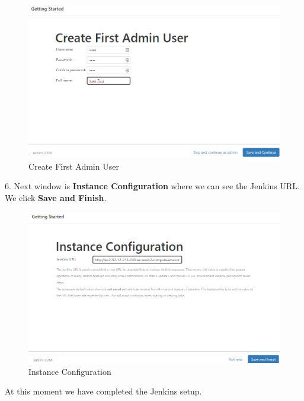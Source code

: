 \documentclass[12pt,a4paper,twoside]{article}
\begin{document}
\begin{figure}[h!]
    \centering
        \includegraphics[width=15cm]{images-aws/26-jenkins-admin-user.png}
        \caption{Create First Admin User}
\end{figure}





6. Next window is \textbf{Instance Configuration} where we can see the Jenkins URL. We click \textbf{Save and Finish}.

\begin{figure}[h!]
    \centering
        \includegraphics[width=15cm]{images-aws/27-jenkins-conf.png}
        \caption{Instance Configuration}
\end{figure}


At this moment we have completed the Jenkins setup.
\end{document}
